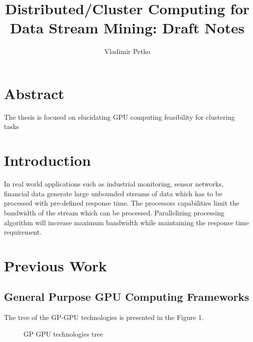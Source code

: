 \documentclass[]{report}
\title{Distributed/Cluster Computing for Data  Stream Mining: Draft Notes}
\author{Vladimir Petko}
\begin{document}
\lstset{language=Java}   
\maketitle

\section*{Abstract}

The thesis is focused on elucidating GPU computing feasibility for clustering tasks

\section*{Introduction}

In real world applications such as industrial monitoring, sensor networks, financial data generate large unbounded streams of data which has to be processed with pre-defined response time. The processors capabilities limit the bandwidth of the stream which can be processed. Parallelizing processing algorithm will increase maximum bandwidth while maintaining the response time requirement.
\section*{Previous Work}
\subsection*{General Purpose GPU Computing Frameworks}

The tree of the GP-GPU technologies is presented in the Figure 1. 
\begin{figure}[htp]
	\caption{\label{GpuTechTree} GP GPU technologies tree \cite{NugterenFig27}}
\end{figure}
\end{document}
